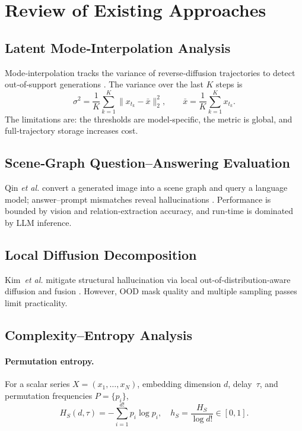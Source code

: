 \documentclass{article}
\begin{document}
\section{Review of Existing Approaches}\label{sec:related}

\subsection{Latent Mode‑Interpolation Analysis}
Mode‑interpolation tracks the variance of reverse‑diffusion
trajectories to detect out‑of‑support generations
\citep{NEURIPS2024_f29369d1}.%
The variance over the last $K$ steps is
\begin{equation}
\sigma^{2}= \frac{1}{K}\sum_{k=1}^{K}\bigl\lVert
x_{t_k}-\bar{x}\bigr\rVert_2^{2}, \qquad
\bar{x}=\frac{1}{K}\sum_{k=1}^{K}x_{t_k}.
\label{eq:traj_var}
\end{equation}
The limitations are: the thresholds are model‑specific, the metric is
global, and full‑trajectory storage increases cost.

\subsection{Scene‑Graph Question–Answering Evaluation}
Qin \emph{et al.} convert a generated image into a scene graph and
query a language model; answer–prompt mismatches reveal hallucinations
\cite{qin2024evaluatinghallucinationtexttoimagediffusion}.
Performance is bounded by vision and relation‑extraction accuracy, and
run‑time is dominated by LLM inference.

\subsection{Local Diffusion Decomposition}
Kim~\emph{et al.} mitigate structural hallucination via local
out-of-distribution‑aware diffusion and fusion \citep{10.1007/978-3-031-73004-7_6}.%
However, OOD mask quality and multiple sampling passes limit
practicality.

\subsection{Complexity–Entropy Analysis}\label{sec:ce}

\paragraph{Permutation entropy.}
For a scalar series $X=(x_1,\dots,x_N)$, embedding dimension $d$,
delay~$\tau$, and permutation frequencies $P=\{p_i\}$,
\begin{equation}
H_S(d,\tau)=-\sum_{i=1}^{d!}p_i\log p_i, \quad
h_S=\frac{H_S}{\log d!}\in[0,1].
\label{eq:perm_entropy}
\end{equation}
\end{document}
